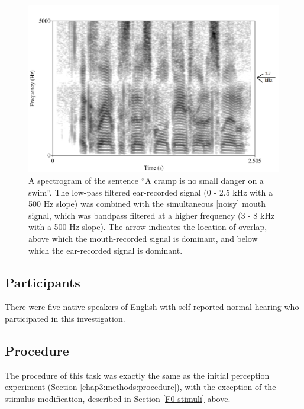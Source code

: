 \begin{figure}[h]
\centering
  \includegraphics[width=\textwidth]{figure/combined-signal_labeled.png}
  \caption{A spectrogram of the sentence ``A cramp is no small danger on a swim''.  The low-pass filtered ear-recorded signal (0 - 2.5 kHz with a 500 Hz slope) was combined with the simultaneous [noisy] mouth signal, which was bandpass filtered at a higher frequency (3 - 8 kHz with a 500 Hz slope).  The arrow indicates the location of overlap, above which the mouth-recorded signal is dominant, and below which the ear-recorded signal is dominant.}
  \label{fig:combined-signal}
\end{figure}
%

\subsection{Participants}
There were five native speakers of English with self-reported normal hearing who participated in this investigation.  

\subsection{Procedure}
The procedure of this task was exactly the same as the initial perception experiment (Section \ref{chap3:methods:procedure}), with the exception of the stimulus modification, described in Section \ref{F0-stimuli} above.



